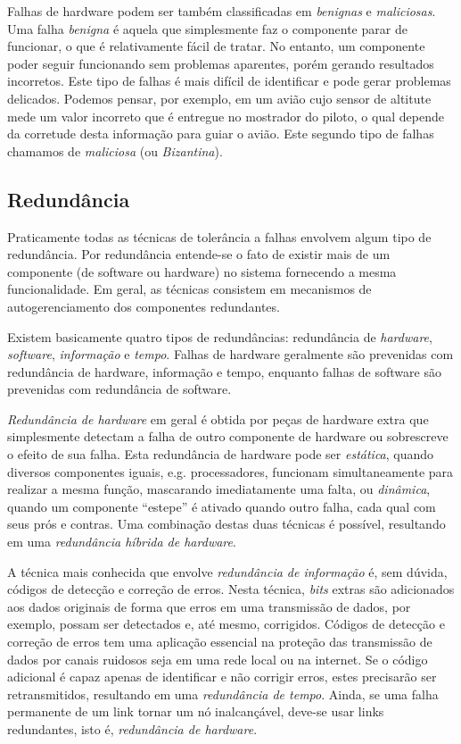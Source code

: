Falhas de hardware podem ser também classificadas em \emph{benignas} e \emph{maliciosas}. Uma falha \emph{benigna} é aquela que simplesmente faz o componente parar de funcionar, o que é relativamente fácil de tratar. No entanto, um componente poder seguir funcionando sem problemas aparentes, porém gerando resultados incorretos. Este tipo de falhas é mais difícil de identificar e pode gerar problemas delicados. Podemos pensar, por exemplo, em um avião cujo sensor de altitute mede um valor incorreto que é entregue no mostrador do piloto, o qual depende da corretude desta informação para guiar o avião. Este segundo tipo de falhas chamamos de \emph{maliciosa} (ou \emph{Bizantina}).

\subsection{Redundância} %
\label{sub:redundancia}

Praticamente todas as técnicas de tolerância a falhas envolvem algum tipo de redundância. Por redundância entende-se o fato de existir mais de um componente (de software ou hardware) no sistema fornecendo a mesma funcionalidade. Em geral, as técnicas consistem em mecanismos de autogerenciamento dos componentes redundantes.

Existem basicamente quatro tipos de redundâncias: redundância de \emph{hardware}, \emph{software}, \emph{informação} e \emph{tempo}. Falhas de hardware geralmente são prevenidas com redundância de hardware, informação e tempo, enquanto falhas de software são prevenidas com redundância de software.

\emph{Redundância de hardware} em geral é obtida por peças de hardware extra que simplesmente detectam a falha de outro componente de hardware ou sobrescreve o efeito de sua falha. Esta redundância de hardware pode ser \emph{estática}, quando diversos componentes iguais, e.g. processadores, funcionam simultaneamente para realizar a mesma função, mascarando imediatamente uma falta, ou \emph{dinâmica}, quando um componente ``estepe'' é ativado quando outro falha, cada qual com seus prós e contras. Uma combinação destas duas técnicas é possível, resultando em uma \emph{redundância híbrida de hardware}.

A técnica mais conhecida que envolve \emph{redundância de informação} é, sem dúvida, códigos de detecção e correção de erros. Nesta técnica, \emph{bits} extras são adicionados aos dados originais de forma que erros em uma transmissão de dados, por exemplo, possam ser detectados e, até mesmo, corrigidos. Códigos de detecção e correção de erros tem uma aplicação essencial na proteção das transmissão de dados por canais ruidosos seja em uma rede local ou na internet. Se o código adicional é capaz apenas de identificar e não corrigir erros, estes precisarão ser retransmitidos, resultando em uma \emph{redundância de tempo}. Ainda, se uma falha permanente de um link tornar um nó inalcançável, deve-se usar links redundantes, isto é, \emph{redundância de hardware}.

